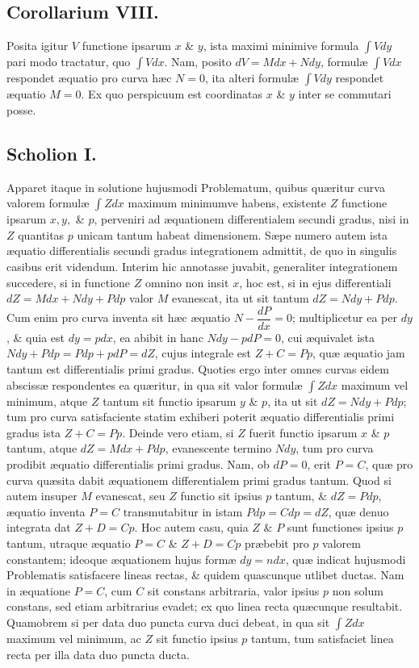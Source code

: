 \subsection*{Corollarium VIII.}
Posita igitur $V$ functione ipsarum $x$ \& $y$, ista maximi minimive formula $\int Vdy$ pari modo tractatur, quo $\int Vdx$. Nam, posito $dV=Mdx+Ndy$, formulæ $\int Vdx$ respondet æquatio pro curva hæc $N=0$, ita alteri formulæ $\int Vdy$ respondet æquatio $M=0$. Ex quo perspicuum est coordinatas $x$ \& $y$ inter se commutari posse.

\subsection*{Scholion I.}
Apparet itaque in solutione hujusmodi Problematum, quibus quæritur curva valorem formulæ $\int Zdx$ maximum minimumve habens, existente $Z$ functione ipsarum $x,y,$ \& $p$, perveniri ad æquationem differentialem secundi gradus, nisi in $Z$ quantitas $p$ unicam tantum habeat dimensionem. Sæpe numero autem ista æquatio differentialis secundi gradus integrationem admittit, de quo in singulis casibus erit videndum. Interim hic annotasse juvabit, generaliter integrationem succedere, si in functione $Z$ omnino non insit $x$, hoc est, si in ejus differentiali $dZ=Mdx+Ndy+Pdp$ valor $M$ evanescat, ita ut sit tantum $dZ=Ndy+Pdp$. Cum enim pro curva inventa sit hæc æquatio $N-\dfrac{dP}{dx}=0$; multiplicetur ea per $dy$, \& quia est $dy=pdx$, ea abibit in hanc $Ndy-pdP=0$, cui æquivalet ista $Ndy+Pdp=Pdp+pdP=dZ$, cujus integrale est $Z+C=Pp$, quæ æquatio jam tantum est differentialis primi gradus. Quoties ergo inter omnes curvas eidem abscissæ respondentes ea quæritur, in qua sit valor formulæ $\int Zdx$ maximum vel minimum, atque $Z$ tantum sit functio ipsarum $y$ \& $p$, ita ut sit $dZ=Ndy+Pdp$; tum pro curva satisfaciente statim exhiberi poterit æquatio differentialis primi gradus ista $Z+C=Pp$. Deinde vero etiam, si $Z$ fuerit functio ipsarum $x$ \& $p$ tantum, atque $dZ=Mdx+Pdp$, evanescente termino $Ndy$, tum pro curva prodibit æquatio differentialis primi gradus. Nam, ob $dP=0$, erit $P=C$, quæ pro curva quæsita dabit æquationem differentialem primi gradus tantum. Quod si autem insuper $M$ evanescat, seu $Z$ functio sit ipsius $p$ tantum, \& $dZ=Pdp$, æquatio inventa $P=C$ transmutabitur in istam $Pdp=Cd p=dZ$, quæ denuo integrata dat $Z+D=Cp$. Hoc autem casu, quia $Z$ \& $P$ sunt functiones ipsius $p$ tantum, utraque æquatio $P=C$ \& $Z+D=Cp$ præbebit pro $p$ valorem constantem; ideoque æquationem hujus formæ $dy=ndx$, quæ indicat hujusmodi Problematis satisfacere lineas rectas, \& quidem quascunque utlibet ductas. Nam in æquatione $P=C$, cum $C$ sit constans arbitraria, valor ipsius $p$ non solum constans, sed etiam arbitrarius evadet; ex quo linea recta quæcunque resultabit. Quamobrem si per data duo puncta curva duci debeat, in qua sit $\int Zdx$ maximum vel minimum, ac $Z$ sit functio ipsius $p$ tantum, tum satisfaciet linea recta per illa data duo puncta ducta.


